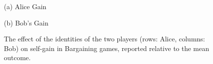 \begin{figure}[ht]

\vspace{1ex}
\begin{minipage}[t]{0.48\textwidth}
    \centering
    \hspace{9em} (a) Alice Gain \par\vspace{1ex}
    
\end{minipage}
\hfill
\begin{minipage}[t]{0.48\textwidth}
    \centering
    (b) Bob's Gain \par\vspace{1ex}
    
\end{minipage}
\caption{\centering
The effect of the identities of the two players (rows: Alice, columns: Bob) on self-gain in Bargaining games, reported relative to the mean outcome.}
\label{table:bargaining_self_gain}
\end{figure}


